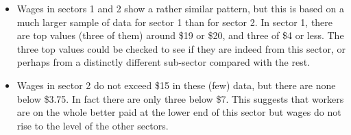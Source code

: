 \documentclass[a4paper,12pt]{article}
\begin{document}
\begin{enumerate}[(a)]
\begin{itemize}
\item Wages in sectors 1 and 2 show a rather similar pattern, but this is based on a much larger sample of data for sector 1 than for sector 2.  In sector 1, there are top values (three of them) around \$19 or \$20, and three of \$4 or less.  The three top values could be checked to see if they are indeed from this sector, or perhaps from a distinctly different sub-sector compared with the rest. 
 
\item Wages in sector 2 do not exceed \$15 in these (few) data, but there are none below \$3.75.  In fact there are only three below \$7.  This suggests that workers are on the whole better paid at the lower end of this sector but wages do not rise to the level of the other sectors. 
\end{itemize}

 
 
\end{enumerate}
\end{document}
